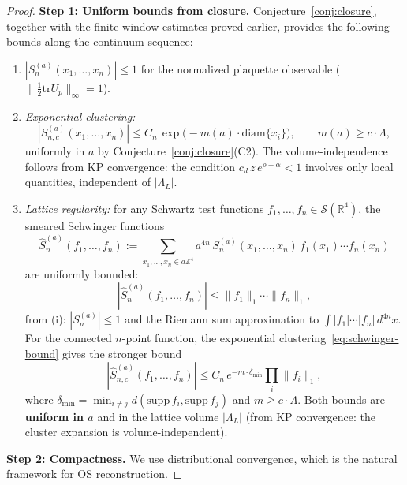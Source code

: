 \documentclass[11pt]{article}
\theoremstyle{definition}
\newcommand{\tr}{\mathrm{tr}}
\newcommand{\R}{\mathbb{R}}
\newcommand{\Z}{\mathbb{Z}}
\begin{document}
\begin{proof}
\textbf{Step 1: Uniform bounds from closure.}
Conjecture~\ref{conj:closure}, together with the finite-window estimates
proved earlier, provides the following bounds along the continuum
sequence:
\begin{enumerate}[nosep,label=(\roman*)]
\item $|S^{(a)}_n(x_1,\ldots,x_n)|\le 1$ for the normalized
plaquette observable ($\|\frac{1}{2}\tr U_p\|_\infty=1$).
\item \emph{Exponential clustering:}
\begin{equation}\label{eq:schwinger-bound}
|S^{(a)}_{n,c}(x_1,\ldots,x_n)|\le
C_n\,\exp\bigl(-m(a)\cdot\mathrm{diam}\{x_i\}\bigr),
\qquad m(a)\ge c\cdot\Lambda,
\end{equation}
uniformly in $a$ by Conjecture~\ref{conj:closure}(C2).
The volume-independence follows from KP convergence:
the condition $c_d\,z\,e^{\rho+\alpha}<1$ involves only
local quantities, independent of $|\Lambda_L|$.
\item \emph{Lattice regularity:} for any Schwartz test functions
$f_1,\ldots,f_n\in\mathcal{S}(\R^4)$, the smeared Schwinger
functions
\begin{equation}\label{eq:smeared}
\hat S_n^{(a)}(f_1,\ldots,f_n)
:=\sum_{x_1,\ldots,x_n\in a\Z^4}a^{4n}\,
S_n^{(a)}(x_1,\ldots,x_n)\,f_1(x_1)\cdots f_n(x_n)
\end{equation}
are uniformly bounded:
\begin{equation}\label{eq:n-point-bound}
|\hat S_n^{(a)}(f_1,\ldots,f_n)|
\le\|f_1\|_1\cdots\|f_n\|_1,
\end{equation}
from (i): $|S_n^{(a)}|\le 1$ and the Riemann sum
approximation to $\int|f_1|\cdots|f_n|\,d^{4n}x$.
For the connected $n$-point function, the exponential
clustering~\eqref{eq:schwinger-bound} gives the
stronger bound
\begin{equation}\label{eq:n-point-connected}
|\hat S_{n,c}^{(a)}(f_1,\ldots,f_n)|
\le C_n\,e^{-m\cdot\delta_{\min}}
\prod_i\|f_i\|_1,
\end{equation}
where $\delta_{\min}=\min_{i\ne j}
d(\mathrm{supp}\,f_i,\mathrm{supp}\,f_j)$
and $m\ge c\cdot\Lambda$.
Both bounds are \textbf{uniform in $a$} and in the
lattice volume $|\Lambda_L|$ (from KP convergence:
the cluster expansion is volume-independent).
\end{enumerate}

\textbf{Step 2: Compactness.}
We use distributional convergence, which is the natural
framework for OS reconstruction.


\end{proof}
\end{document}
